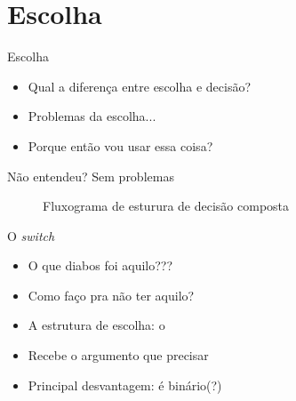 \documentclass[14pt]{beamer}
\subtitle{Dando mais voltas}
\begin{document}
	
	\begin{frame}
		\titlepage
	\end{frame}

	\begin{frame}
		\tableofcontents
	\end{frame}

	\section{Escolha}
		\begin{frame}{Escolha}
			\begin{itemize}
				\presentationPause\item Qual a diferença entre escolha e decisão?
				\presentationPause\item Problemas da escolha...
				\presentationPause\item Porque então vou usar essa coisa?
			\end{itemize}
			\begin{multicols}{2}
				\presentationPause
			\end{multicols}
		\end{frame}

		\begin{frame}{Não entendeu? Sem problemas}
			\presentationPause
			\begin{figure}[H]
				\centering
				
				\caption{Fluxograma de esturura de decisão composta}
				\label{fig.flow.switch.A}
			\end{figure}
		\end{frame}

		\begin{frame}{O \textit{switch}}
			\begin{itemize}
				\presentationPause\item O que diabos foi aquilo?\presentationPause?\presentationPause?
				\presentationPause\item Como faço pra não ter aquilo?
				\presentationPause\item A estrutura de escolha: \presentationPause o \basicCode{switch}
				\presentationPause\item Recebe o argumento que precisar
				\presentationPause\item Principal desvantagem: \presentationPause é binário\presentationPause(?)
			\end{itemize}
		\end{frame}
\end{document}
